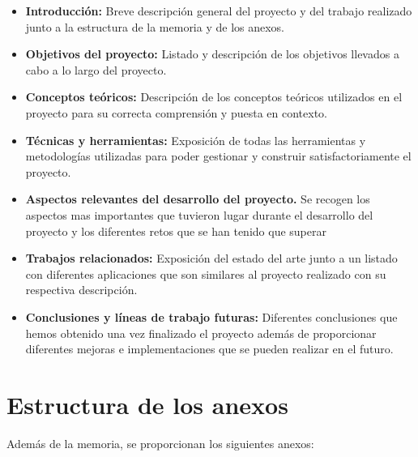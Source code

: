 \begin{itemize}
\tightlist
    \item 
        \textbf{Introducción:} Breve descripción general del proyecto y del trabajo realizado junto a la estructura de la memoria y de los anexos.
    \item 
        \textbf{Objetivos del proyecto:} Listado y descripción de los objetivos llevados a cabo a lo largo del proyecto.
    \item 
        \textbf{Conceptos teóricos:} Descripción de los conceptos teóricos utilizados en el proyecto para su correcta comprensión y puesta en contexto.  
    \item 
        \textbf{Técnicas y herramientas:} Exposición de todas las herramientas y metodologías utilizadas para poder gestionar y construir satisfactoriamente el proyecto.
    \item 
        \textbf{Aspectos relevantes del desarrollo del proyecto.} Se recogen los aspectos mas importantes que tuvieron lugar durante el desarrollo del proyecto y los diferentes retos que se han tenido que superar 
    \item 
        \textbf{Trabajos relacionados:} Exposición del estado del arte junto a un listado con diferentes aplicaciones que son similares al proyecto realizado con su respectiva descripción.
    \item 
        \textbf{Conclusiones y líneas de trabajo futuras:} Diferentes conclusiones que hemos obtenido una vez finalizado el proyecto además de proporcionar diferentes mejoras e implementaciones que se pueden realizar en el futuro.

    
\end{itemize}




\section{Estructura de los anexos}\label{estructura-de-los-anexos}
Además de la memoria, se proporcionan los siguientes anexos:

